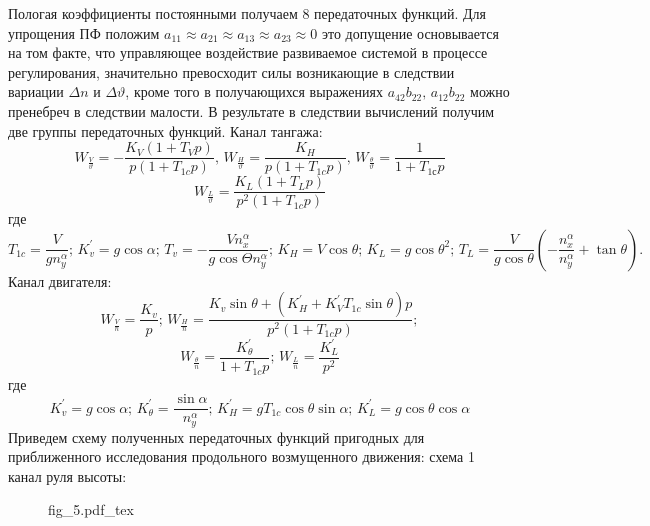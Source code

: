 \documentclass{article}
\begin{document}
Пологая коэффициенты постоянными получаем 8 передаточных функций. Для упрощения ПФ положим $a_{11} \approx a_{21} \approx a_{13} \approx a_{23} \approx 0$ это допущение основывается на том факте, что управляющее воздействие развиваемое системой в процессе регулирования, значительно превосходит силы возникающие в следствии вариации $\Delta n$ и $\Delta \vartheta$, кроме того в получающихся выражениях $a_{42} b_{22}, \, a_{12} b_{22}$ можно пренебреч в следствии малости.
В результате в следствии вычислений получим две группы передаточных функций.
Канал тангажа:\\
\[
W_{\frac{V}{\vartheta}} = -\frac{K_V(1+T_Vp)}{p(1+T_{1c}p)}, \, W_{\frac{H}{\vartheta}} = \frac{K_H}{p(1+T_{1c}p)}, \, W_{\frac{\theta}{\vartheta}} = \frac{1}{1+T_{1с}p}
\]
\[
W_{\frac{L}{\vartheta}} = \frac{K_L(1+T_Lp)}{p^2(1+T_{1c}p)}
\]
где\\
\[
T_{1c} = \frac{V}{g n_y^\alpha}; \, K_v^{'} = g\cos{\alpha}; \, T_v = -\frac{V n_x^\alpha}{g \cos{\Theta} n_y^\alpha};\, K_H = V \cos{\theta}; \, K_L = g \cos{\theta}^2 ;\, T_L= \frac{V}{g \cos{\theta}} (- \frac{n_x^\alpha}{n_y^\alpha} + \tan{\theta}).
\]
Канал двигателя:\\
\[
W_{\frac{V}{n}} = \frac{K_v}{p};\, W_{\frac{H}{n}} = \frac{K_v \sin{\theta} + (K_H^{'} + K_V^{'} T_{1c} \sin{\theta})p}{p^2(1+T_{1c}p)};
\]
\[
W_{\frac{\theta}{n}} = \frac{K_\theta^{'}}{1+T_{1c}p}; \, W_{\frac{L}{n}} = \frac{K_L^{'}}{p^2} 
\]
где \\
\[
K_v^{'} = g\cos{\alpha}; \, K_\theta^{'} = \frac{\sin{\alpha}}{n_y^\alpha}; \, K_H^{'} = gT_{1c} \cos{\theta}\sin{\alpha};\, K_L^{'} = g\cos{\theta} \cos{\alpha}
\]
Приведем схему полученных передаточных функций пригодных для приближенного исследования продольного возмущенного движения:
схема 1 канал руля высоты:
\begin{figure}[h]
{fig_5.pdf_tex}
\end{figure}
\end{document}
